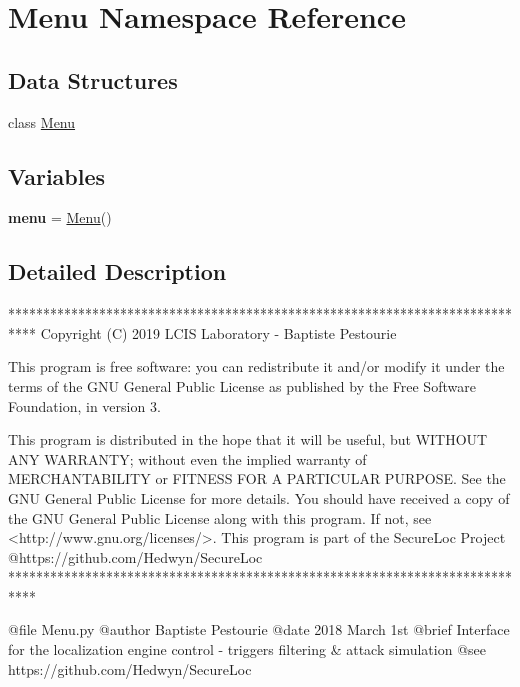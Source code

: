 \hypertarget{namespace_menu}{}\section{Menu Namespace Reference}
\label{namespace_menu}
\subsection*{Data Structures}
\begin{DoxyCompactItemize}
\item 
class \mbox{\hyperlink{class_menu_1_1_menu}{Menu}}
\end{DoxyCompactItemize}
\subsection*{Variables}
\begin{DoxyCompactItemize}
\item 
\mbox{\label{namespace_menu_a905479d79c2aa8410d2fc374bc75cc5b}} 
{\bfseries menu} = \mbox{\hyperlink{class_menu_1_1_menu}{Menu}}()
\end{DoxyCompactItemize}


\subsection{Detailed Description}
\begin{DoxyVerb}****************************************************************************
Copyright (C) 2019 LCIS Laboratory - Baptiste Pestourie

This program is free software: you can redistribute it and/or modify
it under the terms of the GNU General Public License as published by
the Free Software Foundation, in version 3.

This program is distributed in the hope that it will be useful,
but WITHOUT ANY WARRANTY; without even the implied warranty of
MERCHANTABILITY or FITNESS FOR A PARTICULAR PURPOSE. See the
GNU General Public License for more details.
You should have received a copy of the GNU General Public License
along with this program. If not, see <http://www.gnu.org/licenses/>.
This program is part of the SecureLoc Project @https://github.com/Hedwyn/SecureLoc
 ****************************************************************************

@file Menu.py
@author Baptiste Pestourie
@date 2018 March 1st
@brief Interface for the localization engine control - triggers filtering & attack simulation
@see https://github.com/Hedwyn/SecureLoc
\end{DoxyVerb}
 